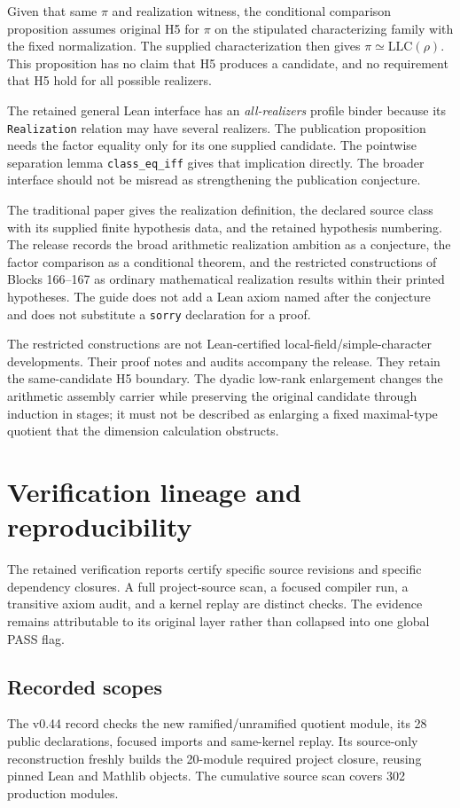 \documentclass[10pt,oneside]{book}
\begin{document}
Given that same \(\pi\) and realization witness, the conditional comparison proposition assumes original H5 for \(\pi\) on the stipulated characterizing family with the fixed normalization. The supplied characterization then gives \(\pi\simeq\mathrm{LLC}(\rho)\). This proposition has no claim that H5 produces a candidate, and no requirement that H5 hold for all possible realizers.

The retained general Lean interface has an \emph{all-realizers} profile binder because its \texttt{Realization} relation may have several realizers. The publication proposition needs the factor equality only for its one supplied candidate. The pointwise separation lemma \texttt{class\_eq\_iff} gives that implication directly. The broader interface should not be misread as strengthening the publication conjecture.

The traditional paper gives the realization definition, the declared source class with its supplied finite hypothesis data, and the retained hypothesis numbering. The release records the broad arithmetic realization ambition as a conjecture, the factor comparison as a conditional theorem, and the restricted constructions of Blocks 166--167 as ordinary mathematical realization results within their printed hypotheses. The guide does not add a Lean axiom named after the conjecture and does not substitute a \texttt{sorry} declaration for a proof.

The restricted constructions are not Lean-certified local-field/simple-character developments. Their proof notes and audits accompany the release. They retain the same-candidate H5 boundary. The dyadic low-rank enlargement changes the arithmetic assembly carrier while preserving the original candidate through induction in stages; it must not be described as enlarging a fixed maximal-type quotient that the dimension calculation obstructs.

\chapter{Verification lineage and reproducibility}
The retained verification reports certify specific source revisions and specific dependency closures. A full project-source scan, a focused compiler run, a transitive axiom audit, and a kernel replay are distinct checks. The evidence remains attributable to its original layer rather than collapsed into one global PASS flag.

\section{Recorded scopes}
The v0.44 record checks the new ramified/unramified quotient module, its 28 public declarations, focused imports and same-kernel replay. Its source-only reconstruction freshly builds the 20-module required project closure, reusing pinned Lean and Mathlib objects. The cumulative source scan covers 302 production modules.
\end{document}

